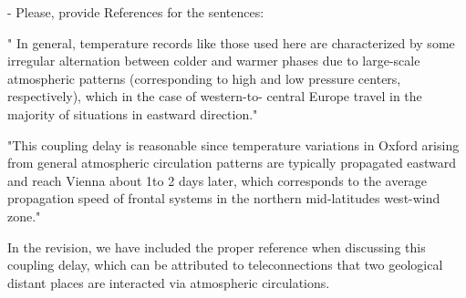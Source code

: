 \documentclass[aps,chaos,superscriptaddress,showkeys]{revtex4}
\begin{document}
\noindent
{- Please, provide References for the sentences: 

" In general, temperature records like those used here are characterized by some irregular alternation between colder and warmer phases due to large-scale atmospheric patterns (corresponding to high and low pressure centers, respectively), which in the case of western-to- central Europe travel in the majority of situations in eastward direction." 


"This coupling delay is reasonable since temperature variations in Oxford arising from general atmospheric circulation patterns are typically propagated eastward and reach Vienna about 1to 2 days later, which corresponds to the average propagation speed of frontal systems in the northern mid-latitudes west-wind zone."}

\begin{center}
\begin{minipage}[c]{0.9\textwidth}
In the revision, we have included the proper reference when discussing this coupling delay, which can be attributed to teleconnections that two geological distant places are interacted via atmospheric circulations. 
\end{minipage}
\end{center}
\end{document}
